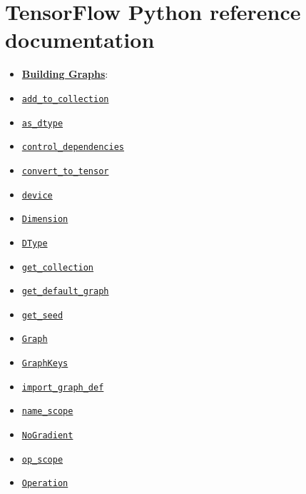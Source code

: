 

\section{TensorFlow Python reference documentation
}\label{tensorflow-python-reference-documentation}

\begin{itemize}
\item
  \textbf{\href{../../api_docs/python/framework.md}{Building Graphs}}:
\item
  \href{../../api_docs/python/framework.md\#add_to_collection}{\texttt{add\_to\_collection}}
\item
  \href{../../api_docs/python/framework.md\#as_dtype}{\texttt{as\_dtype}}
\item
  \href{../../api_docs/python/framework.md\#control_dependencies}{\texttt{control\_dependencies}}
\item
  \href{../../api_docs/python/framework.md\#convert_to_tensor}{\texttt{convert\_to\_tensor}}
\item
  \href{../../api_docs/python/framework.md\#device}{\texttt{device}}
\item
  \href{../../api_docs/python/framework.md\#Dimension}{\texttt{Dimension}}
\item
  \href{../../api_docs/python/framework.md\#DType}{\texttt{DType}}
\item
  \href{../../api_docs/python/framework.md\#get_collection}{\texttt{get\_collection}}
\item
  \href{../../api_docs/python/framework.md\#get_default_graph}{\texttt{get\_default\_graph}}
\item
  \href{../../api_docs/python/framework.md\#get_seed}{\texttt{get\_seed}}
\item
  \href{../../api_docs/python/framework.md\#Graph}{\texttt{Graph}}
\item
  \href{../../api_docs/python/framework.md\#GraphKeys}{\texttt{GraphKeys}}
\item
  \href{../../api_docs/python/framework.md\#import_graph_def}{\texttt{import\_graph\_def}}
\item
  \href{../../api_docs/python/framework.md\#name_scope}{\texttt{name\_scope}}
\item
  \href{../../api_docs/python/framework.md\#NoGradient}{\texttt{NoGradient}}
\item
  \href{../../api_docs/python/framework.md\#op_scope}{\texttt{op\_scope}}
\item
  \href{../../api_docs/python/framework.md\#Operation}{\texttt{Operation}}

\end{itemize}
